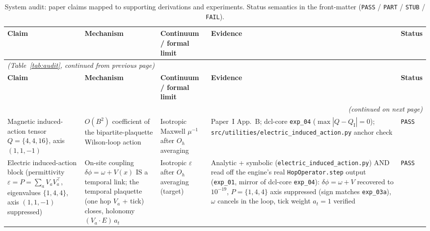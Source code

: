 {\scriptsize
\setlength{\tabcolsep}{4pt}
\renewcommand{\arraystretch}{0.95}
\begin{longtable}{@{}p{2.6cm}p{3.8cm}p{3.2cm}p{4.4cm}p{1.0cm}@{}}
\caption{\small System audit: paper claims mapped to supporting
derivations and experiments.  Status semantics in the front-matter
(\texttt{PASS} / \texttt{PART} / \texttt{STUB} / \texttt{FAIL}).}
\label{tab:audit_caption} \\
\hline
\textbf{Claim} & \textbf{Mechanism} & \textbf{Continuum / formal limit} & \textbf{Evidence} & \textbf{Status} \\
\hline
\endfirsthead

\multicolumn{5}{l}{\textit{(Table~\ref{tab:audit}, continued from previous page)}} \\
\hline
\textbf{Claim} & \textbf{Mechanism} & \textbf{Continuum / formal limit} & \textbf{Evidence} & \textbf{Status} \\
\hline
\endhead

\hline
\multicolumn{5}{r}{\textit{(continued on next page)}} \\
\endfoot

\hline
\endlastfoot

Magnetic induced-action tensor $Q=\{4,4,16\}$, axis $(1,1,-1)$
    & $O(B^2)$ coefficient of the bipartite-plaquette Wilson-loop action
    & Isotropic Maxwell $\mu^{-1}$ after $O_h$ averaging
    & Paper~I App.~B; dcl-core \texttt{exp\_04} ($\max|Q-Q_{\mathrm{I}}|=0$);
      \texttt{src/utilities/electric\_induced\_action.py} anchor check
    & \texttt{PASS} \\

Electric induced-action block (permittivity $\varepsilon = P = \sum_a V_a V_a^{\!\top}$,
eigenvalues $\{1,4,4\}$, axis $(1,1,-1)$ suppressed)
    & On-site coupling $\delta\phi=\omega+V(x)$ IS a temporal link; the temporal
      plaquette (one hop $V_a$ + tick) closes, holonomy $(V_a\!\cdot\!E)\,a_t$
    & Isotropic $\varepsilon$ after $O_h$ averaging (target)
    & Analytic + symbolic (\texttt{electric\_induced\_action.py}) AND read off the engine's
      real \texttt{HopOperator.step} output (\texttt{exp\_01}, mirror of dcl-core
      \texttt{exp\_04}): $\delta\phi{=}\omega{+}V$ recovered to $10^{-19}$, $P{=}\{1,4,4\}$
      axis suppressed (sign matches \texttt{exp\_03a}), $\omega$ cancels in the loop, tick
      weight $a_t{=}1$ verified
    & \texttt{PASS} \\


\end{longtable}}
